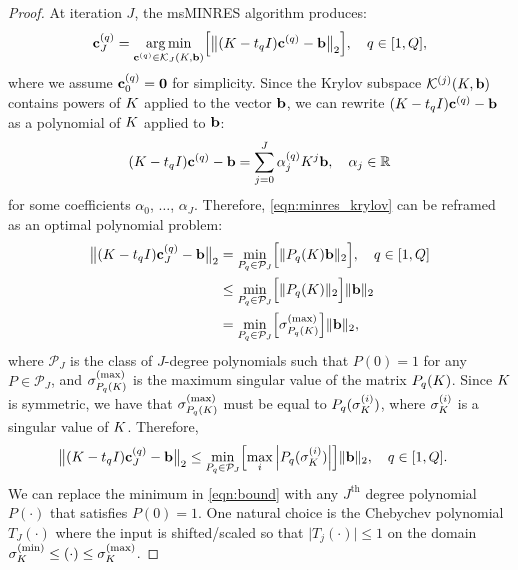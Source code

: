 \begin{proof}
	At iteration $J$, the msMINRES algorithm produces:
	\begin{align}
    \mathbf{c}^{(q)}_J
    = \operatorname*{arg\,min}_{\mathbf{c}^{(q)} \in \mathcal{K}_J(K, \mathbf{b})} \Bigl[
      \bigl\Vert (K - t_q I) \mathbf{c}^{(q)} - \mathbf{b} \bigr\Vert_2
    \Bigr],
    \quad
    q \in [1, Q],
    \label{eqn:minres_krylov}
	\end{align}
  where we assume $\mathbf{c}_0^{(q)} = \mathbf{0}$ for simplicity.
  Since the Krylov subspace $\mathcal{K}^{(j)} (K, \mathbf{b})$ contains powers of $K$ applied to the vector $\mathbf{b}$, we can rewrite
  $(K - t_q I) \mathbf{c}^{(q)} - \mathbf{b}$
  as a polynomial of $K$ applied to $\mathbf{b}$:
  \[ (K - t_q I) \mathbf{c}^{(q)} - \mathbf{b} = \sum_{j=0}^J \alpha_j^{(q)} K^j \mathbf{b}, \quad \alpha_j \in \mathbb{R} \]
  for some coefficients $\alpha_0$, $\ldots$, $\alpha_J$.
  Therefore, \cref{eqn:minres_krylov} can be reframed as an optimal polynomial problem:
	\begin{align*}
    \bigl\Vert (K - t_q I) \mathbf{c}_J^{(q)} - \mathbf{b} \bigr\Vert_2
    &= \min_{P_q \in \mathcal{P}_J} \Bigl[
      \Vert P_q(K) \mathbf{b} \Vert_2
    \Bigr],
    \quad
    q \in [1, Q]
    \\
    &\leq \min_{P_q \in \mathcal{P}_J} \Bigl[
      \Vert P_q(K) \Vert_2
    \Bigr] \Vert \mathbf{b} \Vert_2
    \\
    &= \min_{P_q \in \mathcal{P}_J} \Bigl[
      \sigma^{(\max)}_{P_q(K)}
    \Bigr] \Vert \mathbf{b} \Vert_2,
  \end{align*}
  where $\mathcal{P}_J$ is the class of $J$-degree polynomials such that $P(0) = 1$ for any $P \in \mathcal{P}_J$,
  and $\sigma^{(\max)}_{P_q(K)}$ is the maximum singular value of the matrix $P_q(K)$.
  Since $K$ is symmetric, we have that $\sigma^{(\max)}_{P_q(K)}$ must be equal to $P_q(\sigma^{(i)}_{K})$, where $\sigma^{(i)}_{K}$ is a singular value of $K$.
  Therefore,
  \begin{align}
    \bigl\Vert (K - t_q I) \mathbf{c}_J^{(q)} - \mathbf{b} \bigr\Vert_2
    &\leq \min_{P_q \in \mathcal{P}_J} \Bigl[
      \max_{i}
      \left\vert P_q(\sigma^{(i)}_{K}) \right\vert
    \Bigr] \Vert \mathbf{b} \Vert_2,
    \quad
    q \in [1, Q].
    \label{eqn:bound}
	\end{align}
  We can replace the minimum in \cref{eqn:bound} with any $J^\text{th}$ degree polynomial $P(\cdot)$ that satisfies $P(0) = 1$.
  One natural choice is the Chebychev polynomial $T_J(\cdot)$ where the input is shifted/scaled so that $\vert T_j(\cdot) \vert \leq 1$ on the domain $\sigma^{(\min)}_{K} \leq (\cdot) \leq \sigma^{(\max)}_{K}$.

\end{proof}

